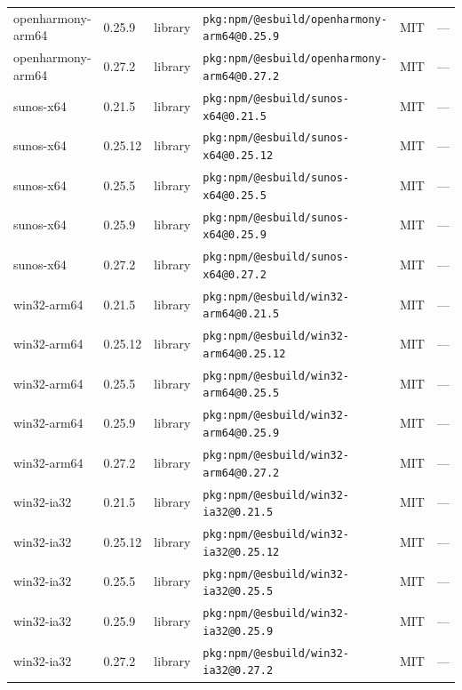 \documentclass[11pt,a4paper]{article}
\begin{document}
\begin{longtable}{|p{4cm}|p{2cm}|p{1.6cm}|p{5cm}|p{1.5cm}|p{3.5cm}|}
\raggedright openharmony-arm64 & 0.25.9 & library & \small\texttt{pkg:npm/@esbuild/openharmony-arm64@0.25.9} & MIT & \small — \\
\raggedright openharmony-arm64 & 0.27.2 & library & \small\texttt{pkg:npm/@esbuild/openharmony-arm64@0.27.2} & MIT & \small — \\
\raggedright sunos-x64 & 0.21.5 & library & \small\texttt{pkg:npm/@esbuild/sunos-x64@0.21.5} & MIT & \small — \\
\raggedright sunos-x64 & 0.25.12 & library & \small\texttt{pkg:npm/@esbuild/sunos-x64@0.25.12} & MIT & \small — \\
\raggedright sunos-x64 & 0.25.5 & library & \small\texttt{pkg:npm/@esbuild/sunos-x64@0.25.5} & MIT & \small — \\
\raggedright sunos-x64 & 0.25.9 & library & \small\texttt{pkg:npm/@esbuild/sunos-x64@0.25.9} & MIT & \small — \\
\raggedright sunos-x64 & 0.27.2 & library & \small\texttt{pkg:npm/@esbuild/sunos-x64@0.27.2} & MIT & \small — \\
\raggedright win32-arm64 & 0.21.5 & library & \small\texttt{pkg:npm/@esbuild/win32-arm64@0.21.5} & MIT & \small — \\
\raggedright win32-arm64 & 0.25.12 & library & \small\texttt{pkg:npm/@esbuild/win32-arm64@0.25.12} & MIT & \small — \\
\raggedright win32-arm64 & 0.25.5 & library & \small\texttt{pkg:npm/@esbuild/win32-arm64@0.25.5} & MIT & \small — \\
\raggedright win32-arm64 & 0.25.9 & library & \small\texttt{pkg:npm/@esbuild/win32-arm64@0.25.9} & MIT & \small — \\
\raggedright win32-arm64 & 0.27.2 & library & \small\texttt{pkg:npm/@esbuild/win32-arm64@0.27.2} & MIT & \small — \\
\raggedright win32-ia32 & 0.21.5 & library & \small\texttt{pkg:npm/@esbuild/win32-ia32@0.21.5} & MIT & \small — \\
\raggedright win32-ia32 & 0.25.12 & library & \small\texttt{pkg:npm/@esbuild/win32-ia32@0.25.12} & MIT & \small — \\
\raggedright win32-ia32 & 0.25.5 & library & \small\texttt{pkg:npm/@esbuild/win32-ia32@0.25.5} & MIT & \small — \\
\raggedright win32-ia32 & 0.25.9 & library & \small\texttt{pkg:npm/@esbuild/win32-ia32@0.25.9} & MIT & \small — \\
\raggedright win32-ia32 & 0.27.2 & library & \small\texttt{pkg:npm/@esbuild/win32-ia32@0.27.2} & MIT & \small — \\

\end{longtable}
\end{document}
